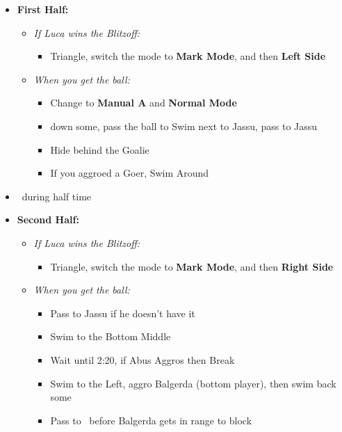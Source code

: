 \begin{blitzball}
    \begin{itemize}
        \item \textbf{First Half:}
        \begin{itemize}
            \item \textit{If Luca wins the Blitzoff:}
            \begin{itemize}
                \item Triangle, switch the mode to \textbf{Mark Mode}, and then \textbf{Left Side}
            \end{itemize}
            \item \textit{When you get the ball:}
            \begin{itemize}
                \item Change to \textbf{Manual A} and \textbf{Normal Mode}
                \item down some, pass the ball to \tidus
                \tidusf Swim next to Jassu, pass to Jassu
                \item Hide behind the Goalie
                \item If you aggroed a Goer, Swim Around
            \end{itemize}
        \end{itemize}
        \item \sd\ during half time
        \item \textbf{Second Half:}
        \begin{itemize}
            \item \textit{If Luca wins the Blitzoff:}
            \begin{itemize}
                \item Triangle, switch the mode to \textbf{Mark Mode}, and then \textbf{Right Side}
            \end{itemize}
            \item \textit{When you get the ball:}
            \begin{itemize}
                \item Pass to Jassu if he doesn't have it
                \item Swim to the Bottom Middle
                \item Wait until 2:20, if Abus Aggros then Break
                \item Swim to the Left, aggro Balgerda (bottom player), then swim back some
                \item Pass to \tidus\ before Balgerda gets in range to block

\end{itemize}
\end{itemize}
\end{itemize}
\end{blitzball}
